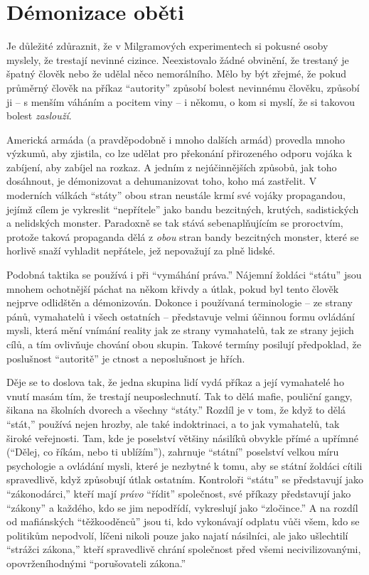 \documentclass{book}
\begin{document}
\section{Démonizace oběti}

Je důležité zdůraznit, že v Milgramových experimentech si pokusné osoby myslely, že trestají nevinné cizince. Neexistovalo žádné obvinění, že trestaný je špatný člověk nebo že udělal něco nemorálního. Mělo by být zřejmé, že pokud průměrný člověk na příkaz \enquote{autority} způsobí bolest nevinnému člověku, způsobí ji -- s menším váháním a pocitem viny -- i někomu, o kom si myslí, že si takovou bolest \emph{zaslouží}.

Americká armáda (a pravděpodobně i mnoho dalších armád) provedla mnoho výzkumů, aby zjistila, co lze udělat pro překonání přirozeného odporu vojáka k zabíjení, aby zabíjel na rozkaz. A jedním z nejúčinnějších způsobů, jak toho dosáhnout, je démonizovat a dehumanizovat toho, koho má zastřelit. V moderních válkách \enquote{státy} obou stran neustále krmí své vojáky propagandou, jejímž cílem je vykreslit \enquote{nepřítele} jako bandu bezcitných, krutých, sadistických a nelidských monster. Paradoxně se tak stává sebenaplňujícím se proroctvím, protože taková propaganda dělá z \emph{obou} stran bandy bezcitných monster, které se horlivě snaží vyhladit nepřátele, jež nepovažují za plně lidské.

Podobná taktika se používá i při \enquote{vymáhání práva.} Nájemní žoldáci \enquote{státu} jsou mnohem ochotnější páchat na někom křivdy a útlak, pokud byl tento člověk nejprve odlidštěn a démonizován. Dokonce i používaná terminologie -- ze strany pánů, vymahatelů i všech ostatních -- představuje velmi účinnou formu ovládání mysli, která mění vnímání reality jak ze strany vymahatelů, tak ze strany jejich cílů, a tím ovlivňuje chování obou skupin. Takové termíny posilují předpoklad, že poslušnost \enquote{autoritě} je ctnost a neposlušnost je hřích.

Děje se to doslova tak, že jedna skupina lidí vydá příkaz a její vymahatelé ho vnutí masám tím, že trestají neuposlechnutí. Tak to dělá mafie, pouliční gangy, šikana na školních dvorech a všechny \enquote{státy.} Rozdíl je v tom, že když to dělá \enquote{stát,} používá nejen hrozby, ale také indoktrinaci, a to jak vymahatelů, tak široké veřejnosti. Tam, kde je poselství většiny násilíků obvykle přímé a upřímné (\enquote{Dělej, co říkám, nebo ti ublížím}), zahrnuje \enquote{státní} poselství velkou míru psychologie a ovládání mysli, které je nezbytné k tomu, aby se státní žoldáci cítili spravedlivě, když způsobují útlak ostatním. Kontroloři \enquote{státu} se představují jako \enquote{zákonodárci,} kteří mají \emph{právo} \enquote{řídit} společnost, své příkazy představují jako \enquote{zákony} a každého, kdo se jim nepodřídí, vykreslují jako \enquote{zločince.} A na rozdíl od mafiánských \enquote{těžkooděnců} jsou ti, kdo vykonávají odplatu vůči všem, kdo se politikům nepodvolí, líčeni nikoli pouze jako najatí násilníci, ale jako ušlechtilí \enquote{strážci zákona,} kteří spravedlivě chrání společnost před všemi necivilizovanými, opovrženíhodnými \enquote{porušovateli zákona.}
\end{document}
